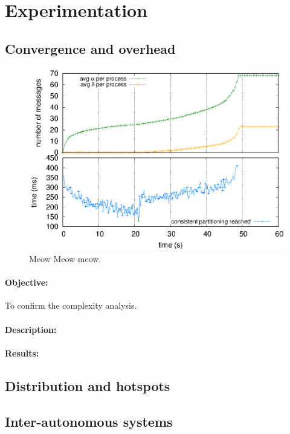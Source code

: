 
\section{Experimentation}
\label{sec:experimentation}


\subsection{Convergence and overhead}


\begin{figure}
  \centering\includegraphics[width=0.99\columnwidth]{img/as_cast_complexity.eps}
  \caption{\label{fig:complexity}Meow Meow meow.}
\end{figure}

\paragraph{Objective:} To confirm the complexity analysis.

\paragraph{Description:} 

\paragraph{Results:}


\subsection{Distribution and hotspots}


\subsection{Inter-autonomous systems}



